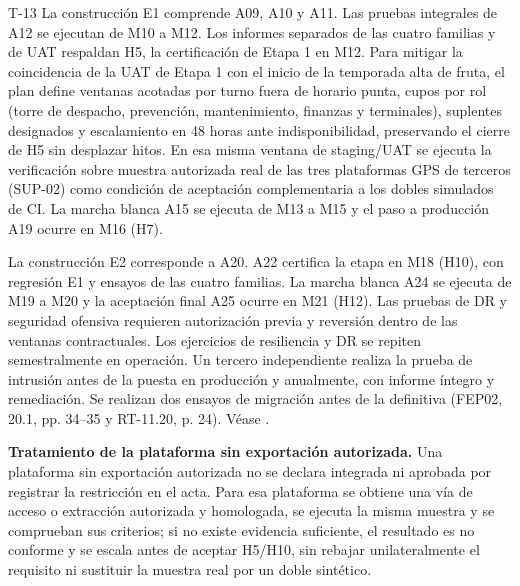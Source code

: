\begin{formulario}{T-13}
La construcción E1 comprende A09, A10 y A11. Las pruebas integrales de A12 se ejecutan de M10 a M12. Los informes separados de las cuatro familias y de UAT respaldan H5, la certificación de Etapa 1 en M12. Para mitigar la coincidencia de la UAT de Etapa 1 con el inicio de la temporada alta de fruta, el plan define ventanas acotadas por turno fuera de horario punta, cupos por rol (torre de despacho, prevención, mantenimiento, finanzas y terminales), suplentes designados y escalamiento en 48 horas ante indisponibilidad, preservando el cierre de H5 sin desplazar hitos. En esa misma ventana de staging/UAT se ejecuta la verificación sobre muestra autorizada real de las tres plataformas GPS de terceros (SUP-02) como condición de aceptación complementaria a los dobles simulados de CI. La marcha blanca A15 se ejecuta de M13 a M15 y el paso a producción A19 ocurre en M16 (H7).

La construcción E2 corresponde a A20. A22 certifica la etapa en M18 (H10), con regresión E1 y ensayos de las cuatro familias. La marcha blanca A24 se ejecuta de M19 a M20 y la aceptación final A25 ocurre en M21 (H12). Las pruebas de DR y seguridad ofensiva requieren autorización previa y reversión dentro de las ventanas contractuales. Los ejercicios de resiliencia y DR se repiten semestralmente en operación. Un tercero independiente realiza la prueba de intrusión antes de la puesta en producción y anualmente, con informe íntegro y remediación. Se realizan dos ensayos de migración antes de la definitiva (FEP02, 20.1, pp. 34--35 y RT-11.20, p. 24). Véase .
\end{formulario}

\par\noindent\textbf{Tratamiento de la plataforma sin exportación autorizada.}
Una plataforma sin exportación autorizada no se declara integrada ni aprobada por registrar la restricción en el acta. Para esa plataforma se obtiene una vía de acceso o extracción autorizada y homologada, se ejecuta la misma muestra y se comprueban sus criterios; si no existe evidencia suficiente, el resultado es no conforme y se escala antes de aceptar H5/H10, sin rebajar unilateralmente el requisito ni sustituir la muestra real por un doble sintético.
